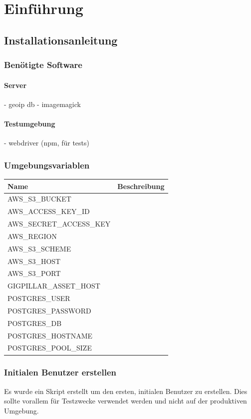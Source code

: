 \chapter{Einführung}\label{AppendixEinführung}

\section{Installationsanleitung}

\subsection{Benötigte Software}

\subsubsection{Server}
- geoip db
- imagemagick

\subsubsection{Testumgebung}
- webdriver (npm, für tests)

\subsection{Umgebungsvariablen}

\begin{longtable}[]{@{}ll@{}}
  \toprule
  \textbf{Name}            & \textbf{Beschreibung}\tabularnewline
  \midrule
  AWS\_S3\_BUCKET          & \tabularnewline
  AWS\_ACCESS\_KEY\_ID     & \tabularnewline
  AWS\_SECRET\_ACCESS\_KEY & \tabularnewline
  AWS\_REGION              & \tabularnewline
  AWS\_S3\_SCHEME          & \tabularnewline
  AWS\_S3\_HOST            & \tabularnewline
  AWS\_S3\_PORT            & \tabularnewline
  GIGPILLAR\_ASSET\_HOST   & \tabularnewline
  POSTGRES\_USER           & \tabularnewline
  POSTGRES\_PASSWORD       & \tabularnewline
  POSTGRES\_DB             & \tabularnewline
  POSTGRES\_HOSTNAME       & \tabularnewline
  POSTGRES\_POOL\_SIZE     & \tabularnewline
  \bottomrule
\end{longtable}

\clearpage
\subsection{Initialen Benutzer erstellen}

Es wurde ein Skript erstellt um den ersten, initialen Benutzer zu erstellen.
Dies sollte vorallem für Testzwecke verwendet werden und nicht auf der
produktiven Umgebung.

